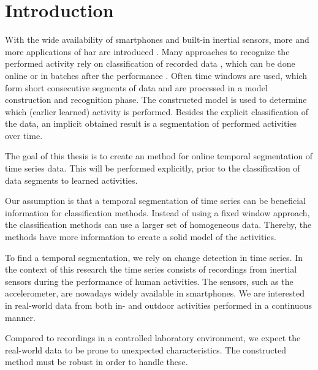 \chapter{Introduction}

\label{Chapter1} %


With the wide availability of smartphones and built-in inertial sensors, more and more applications of \gls{har} are introduced \cite{avci2010activity,derawi2010accelerometer,guenterberg2009distributed}.
Many approaches to recognize the performed activity rely on classification of recorded data \cite{devaul2001real,ward2006activity,yang2008using,anguita2012human,bao2004activity,bernecker2012activity,he2008activity}, which can be done online or in batches after the performance \cite{duque2012offline}.
Often time windows are used, which form short consecutive segments of data and are processed in a model construction and recognition phase.
The constructed model is used to determine which (earlier learned) activity is performed.
Besides the explicit classification of the data, an implicit obtained result is a segmentation of performed activities over time.

The goal of this thesis is to create an method for online temporal segmentation of time series data.
This will be performed explicitly, prior to the classification of data segments to learned activities.

Our assumption is that a temporal segmentation of time series can be beneficial information for classification methods.
Instead of using a fixed window approach, the classification methods can use a larger set of homogeneous data.
Thereby, the methods have more information to create a solid model of the activities.

To find a temporal segmentation, we rely on change detection in time series.
In the context of this research the time series consists of recordings from inertial sensors during the performance of human activities.
The sensors, such as the accelerometer, are nowadays widely available in smartphones.
We are interested in real-world data from both in- and outdoor activities performed in a continuous manner.

Compared to recordings in a controlled laboratory environment, we expect the real-world data to be prone to unexpected characteristics.
The constructed method must be robust in order to handle these.

